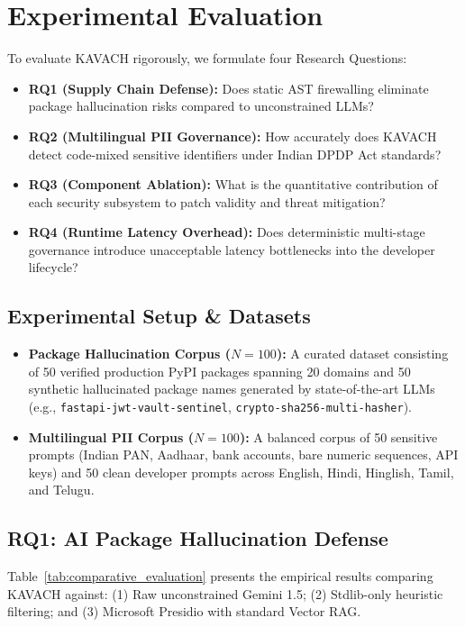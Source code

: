 \documentclass[conference]{IEEEtran}
\begin{document}
\section{Experimental Evaluation}
To evaluate KAVACH rigorously, we formulate four Research Questions:
\begin{itemize}
    \item \textbf{RQ1 (Supply Chain Defense):} Does static AST firewalling eliminate package hallucination risks compared to unconstrained LLMs?
    \item \textbf{RQ2 (Multilingual PII Governance):} How accurately does KAVACH detect code-mixed sensitive identifiers under Indian DPDP Act standards?
    \item \textbf{RQ3 (Component Ablation):} What is the quantitative contribution of each security subsystem to patch validity and threat mitigation?
    \item \textbf{RQ4 (Runtime Latency Overhead):} Does deterministic multi-stage governance introduce unacceptable latency bottlenecks into the developer lifecycle?
\end{itemize}

\subsection{Experimental Setup \& Datasets}
\begin{itemize}
    \item \textbf{Package Hallucination Corpus ($N=100$):} A curated dataset consisting of 50 verified production PyPI packages spanning 20 domains and 50 synthetic hallucinated package names generated by state-of-the-art LLMs (e.g., \texttt{fastapi-jwt-vault-sentinel}, \texttt{crypto-sha256-multi-hasher}).
    \item \textbf{Multilingual PII Corpus ($N=100$):} A balanced corpus of 50 sensitive prompts (Indian PAN, Aadhaar, bank accounts, bare numeric sequences, API keys) and 50 clean developer prompts across English, Hindi, Hinglish, Tamil, and Telugu.
\end{itemize}

\subsection{RQ1: AI Package Hallucination Defense}
Table~\ref{tab:comparative_evaluation} presents the empirical results comparing KAVACH against: (1) Raw unconstrained Gemini 1.5; (2) Stdlib-only heuristic filtering; and (3) Microsoft Presidio with standard Vector RAG.
\end{document}
